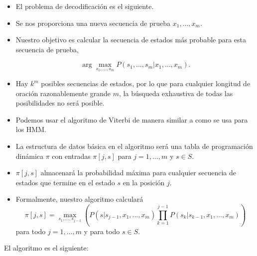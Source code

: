 \begin{itemize}

\item El problema de decodificación es el siguiente.

\item Se nos proporciona una nueva secuencia de prueba $x_1, \dots, x_m$.

\item Nuestro objetivo es calcular la secuencia de estados más probable para esta secuencia de prueba,

\begin{equation}
\operatorname{arg} \max_{s_1,\dots,s_m} P(s_1,\dots,s_m|x_1,\dots,x_m).
\end{equation}

\item Hay $k^m$ posibles secuencias de estados, por lo que para cualquier longitud de oración razonablemente grande $m$, la búsqueda exhaustiva de todas las posibilidades no será posible.

\item Podemos usar el algoritmo de Viterbi de manera similar a como se usa para los HMM.

\item La estructura de datos básica en el algoritmo será una tabla de programación dinámica $\pi$ con entradas $\pi[j,s]$ para $j=1, \dots, m$ y $s \in S$.

\item $\pi[j,s]$ almacenará la probabilidad máxima para cualquier secuencia de estados que termine en el estado $s$ en la posición $j$.

\item Formalmente, nuestro algoritmo calculará
\begin{displaymath}
\pi[j,s] = \max_{s_1,\dots, s_{j-1}}\left(P(s | s_{j-1}, x_1, \dots, x_m) \prod_{k=1}^{j-1} P(s_k | s_{k-1}, x_1, \dots, x_m)\right)
\end{displaymath}
para todo $j = 1, \dots,m$ y para todo $s \in S$.

\end{itemize}

El algoritmo es el siguiente:

